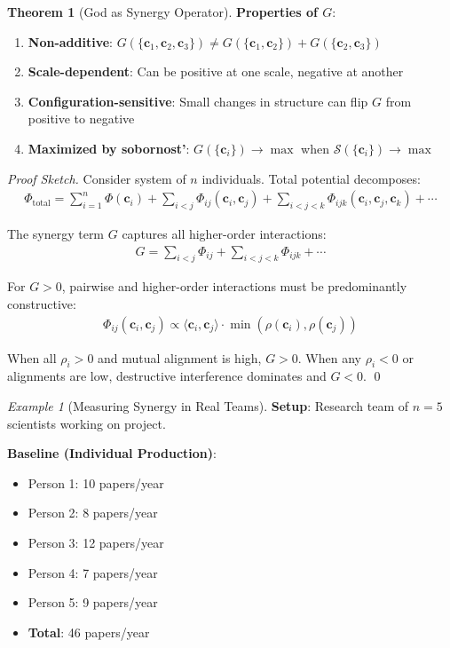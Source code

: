 \documentclass[11pt,a4paper]{article}
\theoremstyle{definition}
\newtheorem{theorem}{Theorem}[section]
\theoremstyle{remark}
\newtheorem{example}{Example}[section]
\newcommand{\cc}{\mathbf{c}}
\begin{document}
\begin{enumerate}
\begin{theorem}[God as Synergy Operator]
\textbf{Properties of \(G\)}:
\begin{enumerate}
    \item \textbf{Non-additive}: \(G(\{\cc_1, \cc_2, \cc_3\}) \neq G(\{\cc_1, \cc_2\}) + G(\{\cc_2, \cc_3\})\)
    \item \textbf{Scale-dependent}: Can be positive at one scale, negative at another
    \item \textbf{Configuration-sensitive}: Small changes in structure can flip \(G\) from positive to negative
    \item \textbf{Maximized by sobornost'}: \(G(\{\cc_i\}) \to \max\) when \(\mathcal{S}(\{\cc_i\}) \to \max\)
\end{enumerate}
\end{theorem}

\begin{proof}[Proof Sketch]
Consider system of \(n\) individuals. Total potential decomposes:
\begin{align}
\Phi_{\text{total}} = \sum_{i=1}^n \Phi(\cc_i) + \sum_{i<j} \Phi_{ij}(\cc_i, \cc_j) + \sum_{i<j<k} \Phi_{ijk}(\cc_i, \cc_j, \cc_k) + \cdots
\end{align}

The synergy term \(G\) captures all higher-order interactions:
\begin{align}
G = \sum_{i<j} \Phi_{ij} + \sum_{i<j<k} \Phi_{ijk} + \cdots
\end{align}

For \(G > 0\), pairwise and higher-order interactions must be predominantly constructive:
\begin{align}
\Phi_{ij}(\cc_i, \cc_j) \propto \langle \cc_i, \cc_j \rangle \cdot \min(\rho(\cc_i), \rho(\cc_j))
\end{align}

When all \(\rho_i > 0\) and mutual alignment is high, \(G > 0\). When any \(\rho_i < 0\) or alignments are low, destructive interference dominates and \(G < 0\). \qed
\end{proof}

\begin{example}[Measuring Synergy in Real Teams]
\textbf{Setup}: Research team of \(n=5\) scientists working on project.

\textbf{Baseline (Individual Production)}:
\begin{itemize}
    \item Person 1: 10 papers/year
    \item Person 2: 8 papers/year
    \item Person 3: 12 papers/year
    \item Person 4: 7 papers/year
    \item Person 5: 9 papers/year
    \item \textbf{Total}: 46 papers/year
\end{itemize}


\end{example}
\end{enumerate}
\end{document}
